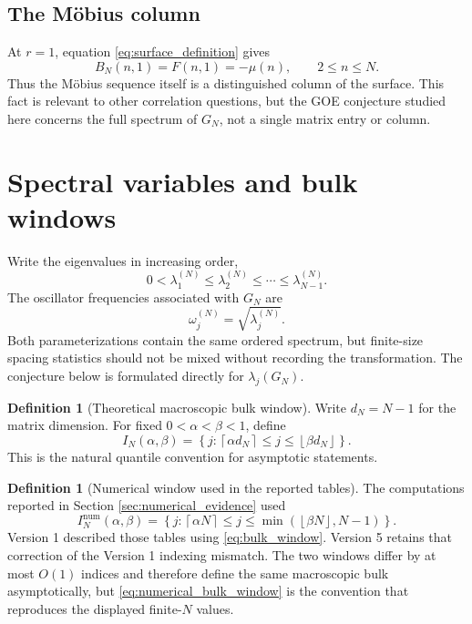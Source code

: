 \documentclass[11pt]{amsart}
\numberwithin{equation}{section}
\theoremstyle{plain}
\theoremstyle{definition}
\newtheorem{definition}[theorem]{Definition}
\theoremstyle{remark}
\newcommand{\mob}{\mu}
\begin{document}
\subsection{The M\"obius column}
\label{subsec:mobius_column}

At $r=1$, equation \eqref{eq:surface_definition} gives
\begin{equation}
B_N(n,1)=F(n,1)=-\mob(n),
\qquad 2\le n\le N.
\label{eq:first_column_mobius}
\end{equation}
Thus the M\"obius sequence itself is a distinguished column of the surface.  This fact is relevant to other correlation questions, but the GOE conjecture studied here concerns the full spectrum of $G_N$, not a single matrix entry or column.

\section{Spectral variables and bulk windows}
\label{sec:spectral_variables}

Write the eigenvalues in increasing order,
\begin{equation}
0<\lambda_1^{(N)}\le\lambda_2^{(N)}\le\cdots\le\lambda_{N-1}^{(N)}.
\label{eq:eigenvalue_order}
\end{equation}
The oscillator frequencies associated with $G_N$ are
\begin{equation}
\omega_j^{(N)}=\sqrt{\lambda_j^{(N)}}.
\label{eq:oscillator_frequency}
\end{equation}
Both parameterizations contain the same ordered spectrum, but finite-size spacing statistics should not be mixed without recording the transformation.  The conjecture below is formulated directly for $\lambda_j(G_N)$.

\begin{definition}[Theoretical macroscopic bulk window]
\label{def:bulk_window}
Write $d_N=N-1$ for the matrix dimension.  For fixed $0<\alpha<\beta<1$, define
\begin{equation}
I_N(\alpha,\beta)
=
\left\{j:\left\lceil\alpha d_N\right\rceil
\le j\le
\left\lfloor\beta d_N\right\rfloor\right\}.
\label{eq:bulk_window}
\end{equation}
This is the natural quantile convention for asymptotic statements.
\end{definition}

\begin{definition}[Numerical window used in the reported tables]
\label{def:numerical_bulk_window}
The computations reported in Section \ref{sec:numerical_evidence} used
\begin{equation}
I_N^{\mathrm{num}}(\alpha,\beta)
=
\left\{j:\left\lceil\alpha N\right\rceil
\le j\le
\min\!\left(\left\lfloor\beta N\right\rfloor,N-1\right)\right\}.
\label{eq:numerical_bulk_window}
\end{equation}
Version 1 described those tables using \eqref{eq:bulk_window}.  Version 5 retains that correction of the Version 1 indexing mismatch.  The two windows differ by at most $O(1)$ indices and therefore define the same macroscopic bulk asymptotically, but \eqref{eq:numerical_bulk_window} is the convention that reproduces the displayed finite-$N$ values.
\end{definition}
\end{document}
